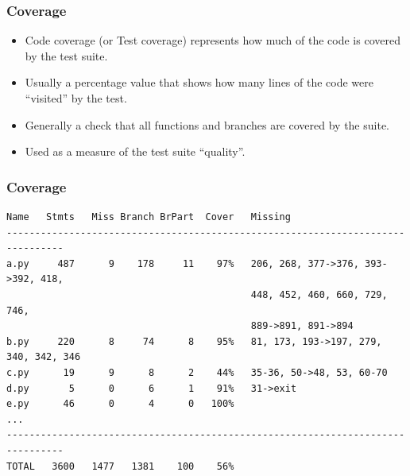 \documentclass[aspectratio=169]{beamer}
\begin{document}
\begin{frame}
	\frametitle{Coverage}
	
	\begin{block}{}
		\begin{itemize}
			\item Code coverage (or Test coverage) represents how much of the code is covered by the test suite.
			\item Usually a percentage value that shows how many lines of the code were “visited” by the test.
			\item Generally a check that all functions and branches are covered by the suite.
			\item Used as a measure of the test suite “quality”.
		\end{itemize}
	\end{block}
\end{frame}

\begin{frame}[fragile]
	\frametitle{Coverage}
	
\begin{center}
\begin{lstlisting}[frame=none, basicstyle=\ttfamily\small, columns=fullflexible, keepspaces=true]
Name   Stmts   Miss Branch BrPart  Cover   Missing
--------------------------------------------------------------------------------
a.py     487      9    178     11    97%   206, 268, 377->376, 393->392, 418, 
                                           448, 452, 460, 660, 729, 746, 
                                           889->891, 891->894
b.py     220      8     74      8    95%   81, 173, 193->197, 279, 340, 342, 346
c.py      19      9      8      2    44%   35-36, 50->48, 53, 60-70
d.py       5      0      6      1    91%   31->exit
e.py      46      0      4      0   100%
...
--------------------------------------------------------------------------------
TOTAL   3600   1477   1381    100    56%
\end{lstlisting}
	
\end{center}
\end{frame}
\end{document}
